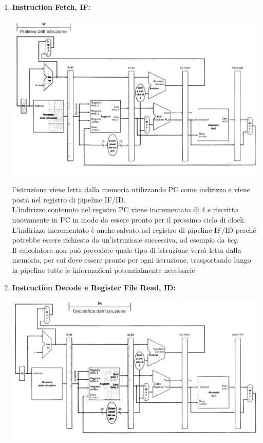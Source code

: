 \documentclass[a4paper,12pt, oneside]{book}
\begin{document}
\begin{enumerate}
  \item \textbf{Instruction Fetch, IF:}
  \begin{center}
    \includegraphics[scale = 0.7]{img/pipe4.png}
  \end{center}
  l'istruzione viene letta dalla memoria utilizzando PC come
  indirizzo e viene posta nel registro di pipeline IF/ID.\\
  L'indirizzo contenuto nel registro PC viene incrementato di 4 e riscritto
  nuovamente in PC in modo da essere pronto per il prossimo ciclo di
  clock.\\
  L'indirizzo incrementato è anche salvato nel registro di pipeline
  IF/ID perché potrebbe essere richiesto da un'istruzione successiva,
  ad esempio da \textit{beq}.\\
  Il calcolatore non può prevedere quale tipo di istruzione verrà
  letta dalla memoria, per cui deve essere pronto per ogni istruzione,
  trasportando lungo la pipeline tutte le informazioni potenzialmente
  necessarie
  \newpage
  \item \textbf{Instruction Decode e Register File Read, ID:}
  \begin{center}
    \includegraphics[scale = 0.7]{img/pipe5.png}

\end{center}
\end{enumerate}
\end{document}
